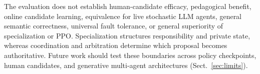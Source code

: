 \documentclass[runningheads,a4paper]{llncs}
\begin{document}
The evaluation does not establish human-candidate efficacy, pedagogical benefit, online candidate learning, equivalence for live stochastic LLM agents, general semantic correctness, universal fault tolerance, or general superiority of specialization or PPO. Specialization structures responsibility and private state, whereas coordination and arbitration determine which proposal becomes authoritative. Future work should test these boundaries across policy checkpoints, human candidates, and generative multi-agent architectures (Sect.~\ref{sec:limits}).

\let\oldthebibliography\thebibliography
\let\endoldthebibliography\endthebibliography
\renewenvironment{thebibliography}[1]{%
  \begin{oldthebibliography}{#1}%
    \setlength{\itemsep}{0pt}%
    \setlength{\parsep}{0pt}%
    \emergencystretch=4em%
}{%
  \end{oldthebibliography}%
}


\end{document}
